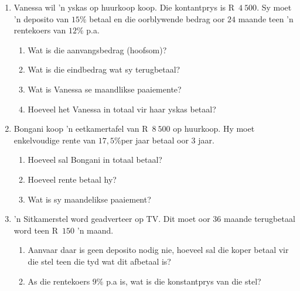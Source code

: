 \begin{exercises}{}{
    \begin{enumerate}[label=\textbf{\arabic*}.]
	\item Vanessa wil 'n yskas op huurkoop koop. Die kontantprys is R~$4~500$. Sy moet 'n deposito van $15\%$ betaal en die oorblywende bedrag oor $24$ maande teen 'n rentekoers van $12\%$ p.a.
	\begin{enumerate}[label=\textbf{(\alph*)}]
	    \item Wat is die aanvangsbedrag (hoofsom)?
	    \item Wat is die eindbedrag wat sy terugbetaal?
	    \item Wat is Vanessa se maandlikse paaiemente?
	    \item Hoeveel het Vanessa in totaal vir haar yskas betaal?
	\end{enumerate}


	\item Bongani koop ’n eetkamertafel van R~$8~500$ op huurkoop. Hy moet enkelvoudige rente van $17,5\%$per jaar betaal oor 3 jaar.
	\begin{enumerate}[label=\textbf{(\alph*)}]
	    \item Hoeveel sal Bongani in totaal betaal?
	    \item  Hoeveel rente betaal hy?
	    \item Wat is sy maandelikse paaiement?
	\end{enumerate}

	\item 'n Sitkamerstel word geadverteer op TV. Dit moet oor $36$ maande terugbetaal word teen R~$150$ 'n maand.
	\begin{enumerate}[label=\textbf{(\alph*)}]
	    \item Aanvaar daar is geen deposito nodig nie, hoeveel sal die koper betaal vir die stel teen die tyd wat dit afbetaal is?
	    \item As die rentekoers $9\%$ p.a is, wat is die konstantprys van die stel?\\
	\end{enumerate}
    \end{enumerate}
}
\end{exercises}


